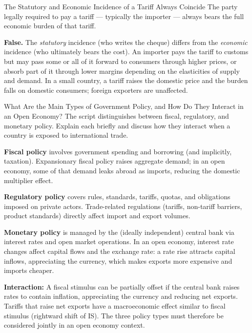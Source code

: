 \documentclass[paper=a5]{scrartcl}
\begin{document}
\begin{question}[type=tf]{The Statutory and Economic Incidence of a Tariff Always
  Coincide}
The party legally required to pay a tariff --- typically the importer ---
always bears the full economic burden of that tariff.
\truefalse[false]
\begin{solution}
  \textbf{False.} The \emph{statutory} incidence (who writes the cheque)
  differs from the \emph{economic} incidence (who ultimately bears the cost).
  An importer pays the tariff to customs but may pass some or all of it
  forward to consumers through higher prices, or absorb part of it through
  lower margins depending on the elasticities of supply and demand. In a
  small country, a tariff raises the domestic price and the burden falls on
  domestic consumers; foreign exporters are unaffected.
\end{solution}
\end{question}

\begin{question}[type=open]{What Are the Main Types of Government Policy, and How
  Do They Interact in an Open Economy?}
The script distinguishes between fiscal, regulatory, and monetary policy.
Explain each briefly and discuss how they interact when a country is exposed
to international trade.

\answerlines[7]

\begin{solution}
  \textbf{Fiscal policy} involves government spending and borrowing (and
  implicitly, taxation). Expansionary fiscal policy raises aggregate demand;
  in an open economy, some of that demand leaks abroad as imports, reducing
  the domestic multiplier effect.

  \textbf{Regulatory policy} covers rules, standards, tariffs, quotas, and
  obligations imposed on private actors. Trade-related regulations (tariffs,
  non-tariff barriers, product standards) directly affect import and export
  volumes.

  \textbf{Monetary policy} is managed by the (ideally independent) central
  bank via interest rates and open market operations. In an open economy,
  interest rate changes affect capital flows and the exchange rate: a rate
  rise attracts capital inflows, appreciating the currency, which makes
  exports more expensive and imports cheaper.

  \textbf{Interaction:} A fiscal stimulus can be partially offset if the
  central bank raises rates to contain inflation, appreciating the currency
  and reducing net exports. Tariffs that raise net exports have a
  macroeconomic effect similar to fiscal stimulus (rightward shift of IS).
  The three policy types must therefore be considered jointly in an open
  economy context.
\end{solution}
\end{question}
\end{document}
